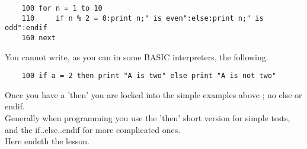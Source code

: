 \begin{verbatim}
	100 for n = 1 to 10
	110 	if n % 2 = 0:print n;" is even":else:print n;" is odd":endif
	160 next
\end{verbatim}

You cannot write, as you can in some BASIC interpreters, the following.

\begin{verbatim}
	100 if a = 2 then print "A is two" else print "A is not two"
\end{verbatim}

Once you have a 'then' you are locked into the simple examples above ; no else or endif.\\

Generally when programming you use the 'then' short version for simple tests, and the if..else..endif for more complicated ones.\\

Here endeth the lesson.

